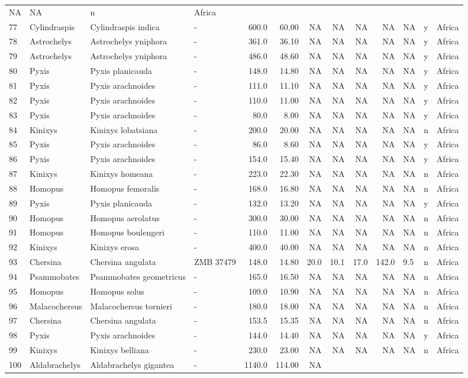 \begin{landscape}
{\begin{longtable}[]{@{}llllrrrrrrlll@{}}
	NA & NA & n & Africa\tabularnewline
	77 & Cylindraspis & Cylindraspis indica & - & 600.0 & 60.00 & NA & NA &
	NA & NA & NA & y & Africa\tabularnewline
	78 & Astrochelys & Astrochelys yniphora & - & 361.0 & 36.10 & NA & NA &
	NA & NA & NA & y & Africa\tabularnewline
	79 & Astrochelys & Astrochelys yniphora & - & 486.0 & 48.60 & NA & NA &
	NA & NA & NA & y & Africa\tabularnewline
	80 & Pyxis & Pyxis planicauda & - & 148.0 & 14.80 & NA & NA & NA & NA &
	NA & y & Africa\tabularnewline
	81 & Pyxis & Pyxis arachnoides & - & 111.0 & 11.10 & NA & NA & NA & NA &
	NA & y & Africa\tabularnewline
	82 & Pyxis & Pyxis arachnoides & - & 110.0 & 11.00 & NA & NA & NA & NA &
	NA & y & Africa\tabularnewline
	83 & Pyxis & Pyxis arachnoides & - & 80.0 & 8.00 & NA & NA & NA & NA &
	NA & y & Africa\tabularnewline
	84 & Kinixys & Kinixys lobatsiana & - & 200.0 & 20.00 & NA & NA & NA &
	NA & NA & n & Africa\tabularnewline
	85 & Pyxis & Pyxis arachnoides & - & 86.0 & 8.60 & NA & NA & NA & NA &
	NA & y & Africa\tabularnewline
	86 & Pyxis & Pyxis arachnoides & - & 154.0 & 15.40 & NA & NA & NA & NA &
	NA & y & Africa\tabularnewline
	87 & Kinixys & Kinixys homeana & - & 223.0 & 22.30 & NA & NA & NA & NA &
	NA & n & Africa\tabularnewline
	88 & Homopus & Homopus femoralis & - & 168.0 & 16.80 & NA & NA & NA & NA
	& NA & n & Africa\tabularnewline
	89 & Pyxis & Pyxis planicauda & - & 132.0 & 13.20 & NA & NA & NA & NA &
	NA & y & Africa\tabularnewline
	90 & Homopus & Homopus aerolatus & - & 300.0 & 30.00 & NA & NA & NA & NA
	& NA & n & Africa\tabularnewline
	91 & Homopus & Homopus boulengeri & - & 110.0 & 11.00 & NA & NA & NA &
	NA & NA & n & Africa\tabularnewline
	92 & Kinixys & Kinixys erosa & - & 400.0 & 40.00 & NA & NA & NA & NA &
	NA & n & Africa\tabularnewline
	93 & Chersina & Chersina angulata & ZMB 37479 & 148.0 & 14.80 & 20.0 &
	10.1 & 17.0 & 142.0 & 9.5 & n & Africa\tabularnewline
	94 & Psammobates & Psammobates geometricus & - & 165.0 & 16.50 & NA & NA
	& NA & NA & NA & n & Africa\tabularnewline
	95 & Homopus & Homopus solus & - & 109.0 & 10.90 & NA & NA & NA & NA &
	NA & n & Africa\tabularnewline
	96 & Malacochersus & Malacochersus tornieri & - & 180.0 & 18.00 & NA &
	NA & NA & NA & NA & n & Africa\tabularnewline
	97 & Chersina & Chersina angulata & - & 153.5 & 15.35 & NA & NA & NA &
	NA & NA & n & Africa\tabularnewline
	98 & Pyxis & Pyxis arachnoides & - & 144.0 & 14.40 & NA & NA & NA & NA &
	NA & y & Africa\tabularnewline
	99 & Kinixys & Kinixys belliana & - & 230.0 & 23.00 & NA & NA & NA & NA
	& NA & n & Africa\tabularnewline
	100 & Aldabrachelys & Aldabrachelys gigantea & - & 1140.0 & 114.00 & NA

\end{longtable}}
\end{landscape}
